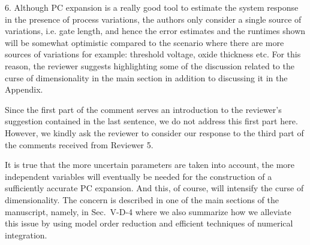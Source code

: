 \begin{reviewer}
6. Although PC expansion is a really good tool to estimate the system response in the presence of process variations, the authors only consider a single source of variations, i.e. gate length, and hence the error estimates and the runtimes shown will be somewhat optimistic compared to the scenario where there are more sources of variations for example: threshold voltage, oxide thickness etc. For this reason, the reviewer suggests highlighting some of the discussion related to the curse of dimensionality in the main section in addition to discussing it in the Appendix.
\end{reviewer}
\begin{authors}
Since the first part of the comment serves an introduction to the reviewer's suggestion contained in the last sentence, we do not address this first part here.
However, we kindly ask the reviewer to consider our response to the third part of the comments received from Reviewer 5.

It is true that the more uncertain parameters are taken into account, the more independent variables will eventually be needed for the construction of a sufficiently accurate PC expansion.
And this, of course, will intensify the curse of dimensionality.
The concern is described in one of the main sections of the manuscript, namely, in Sec.~V-D-4 where we also summarize how we alleviate this issue by using model order reduction and efficient techniques of numerical integration.

\end{authors}

